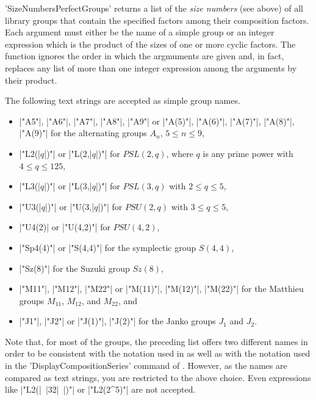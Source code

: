'SizeNumbersPerfectGroups' returns a list of  the {\it size numbers} (see
above) of all  library groups that contain   the specified factors  among
their composition  factors.  Each argument must either  be  the name of a
simple group or  an integer expression which  is the product of the sizes
of one or  more cyclic factors.  The function  ignores the order in which
the argmuments are given and, in fact, replaces any list of more than one
integer expression among the arguments by their product.

The following text strings are accepted as simple group names.
\vspace{-2mm}
\begin{itemize}
\item[] |"A5"|, |"A6"|, |"A7"|, |"A8"|,  |"A9"|  or  |"A(5)"|,  |"A(6)"|,
      |"A(7)"|, |"A(8)"|, |"A(9)"|  for the alternating groups  $A_n$, $5
      \leq n \leq 9$, \vspace{-2mm}
\item[] |"L2(|$q$|)"|  or |"L(2,|$q$|)"| for $PSL(2,q)$, where $q$ is any
      prime power with $4 \leq q \leq 125$, \vspace{-2mm}
\item[] |"L3(|$q$|)"|  or  |"L(3,|$q$|)"|  for $PSL(3,q)$  with $2 \leq q
      \leq 5$, \vspace{-2mm}
\item[] |"U3(|$q$|)"|  or  |"U(3,|$q$|)"|  for $PSU(2,q)$  with $3 \leq q
      \leq 5$, \vspace{-2mm}
\item[] |"U4(2)| or |"U(4,2)"| for $PSU(4,2)$, \vspace{-2mm}
\item[] |"Sp4(4)"| or |"S(4,4)"| for the symplectic group $S(4,4)$,
      \vspace{-2mm}
\item[] |"Sz(8)"| for the Suzuki group $Sz(8)$, \vspace{-2mm}
\item[] |"M11"|, |"M12"|, |"M22"|  or |"M(11)"|, |"M(12)"|, |"M(22)"| for
      the Matthieu groups $M_{11}$, $M_{12}$, and $M_{22}$, and
      \vspace{-2mm}
\item[] |"J1"|, |"J2"|  or  |"J(1)"|, |"J(2)"| for the Janko groups $J_1$
      and $J_2$. \vspace{-2mm}
\end{itemize}

Note that,    for most of  the  groups,  the preceding   list  offers two
different names in order  to  be consistent  with  the notation  used  in
\cite{HP89}       as  well  as   with    the    notation    used in   the
'DisplayCompositionSeries' command of {\GAP}. However,  as the names  are
compared as text strings,  you are restricted to  the above  choice. Even
expressions like |"L2(|~|32|~|)"| or |"L2(2^5)"| are not accepted.

